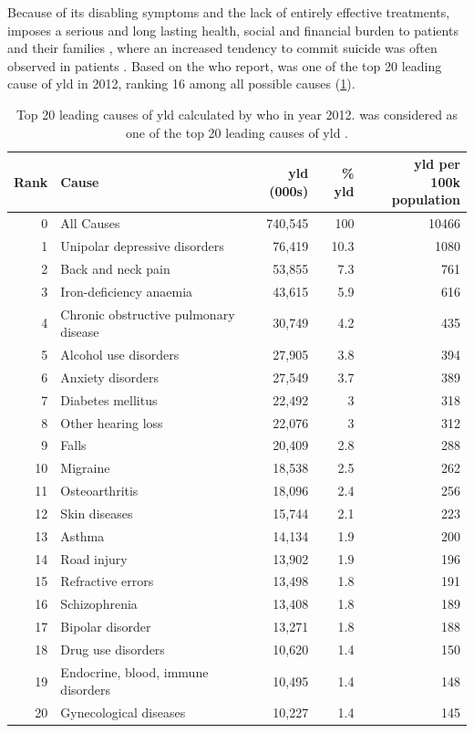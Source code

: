 	Because of its disabling symptoms and the lack of entirely effective treatments,  imposes a serious and long lasting health, social and financial burden to patients and their families \citep{Knapp2004}, where an increased tendency to commit suicide was often observed in  patients \citep{Saha2007}.
	Based on the \gls{who} report,  was one of the top 20 leading cause of \gls{yld} in 2012, ranking 16 among all possible causes (\cref{tab:whoYLD}).
	\begin{table}[ht]
		\centering
		\caption[Top 20 leading causes of ]{Top 20 leading causes of \gls{yld} calculated by \gls{who} in year 2012.
			 was considered as one of the top 20 leading causes of \gls{yld} \citep{Geneva2013}.}
		\begin{tabular}{rp{5cm}rrr}
			\toprule
			Rank  & Cause & \gls{yld} (000s) & \% \gls{yld} & \specialcell[b]{\gls{yld} per \\100k population}\\
			\midrule
			0     & All Causes & 740,545 & 100   & 10466 \\
			1     & Unipolar depressive disorders & 76,419 & 10.3  & 1080 \\
			2     & Back and neck pain & 53,855 & 7.3   & 761 \\
			3     & Iron-deficiency anaemia & 43,615 & 5.9   & 616 \\
			4     & Chronic obstructive pulmonary disease & 30,749 & 4.2   & 435 \\
			5     & Alcohol use disorders & 27,905 & 3.8   & 394 \\
			6     & Anxiety disorders & 27,549 & 3.7   & 389 \\
			7     & Diabetes mellitus & 22,492 & 3     & 318 \\
			8     & Other hearing loss & 22,076 & 3     & 312 \\
			9     & Falls & 20,409 & 2.8   & 288 \\
			10    & Migraine & 18,538 & 2.5   & 262 \\
			11    & Osteoarthritis & 18,096 & 2.4   & 256 \\
			12    & Skin diseases & 15,744 & 2.1   & 223 \\
			13    & Asthma & 14,134 & 1.9   & 200 \\
			14    & Road injury & 13,902 & 1.9   & 196 \\
			15    & Refractive errors & 13,498 & 1.8   & 191 \\
			16    & Schizophrenia & 13,408 & 1.8   & 189 \\
			17    & Bipolar disorder & 13,271 & 1.8   & 188 \\
			18    & Drug use disorders & 10,620 & 1.4   & 150 \\
			19    & Endocrine, blood, immune disorders & 10,495 & 1.4   & 148 \\
			20    & Gynecological diseases & 10,227 & 1.4   & 145 \\
			\bottomrule
		\end{tabular}%
		\label{tab:whoYLD}%
	\end{table}%
